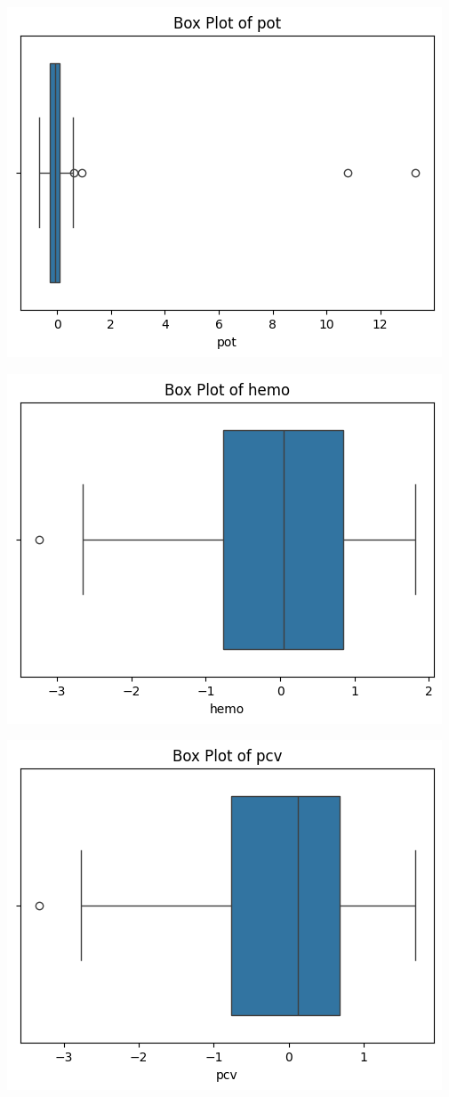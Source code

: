 \documentclass[
  11pt,
  letterpaper,
  DIV=11,
  numbers=noendperiod]{scrartcl}
\begin{document}
\includegraphics{Assignment6_Final version_files/figure-pdf/cell-18-output-8.png}

\includegraphics{Assignment6_Final version_files/figure-pdf/cell-18-output-9.png}

\includegraphics{Assignment6_Final version_files/figure-pdf/cell-18-output-10.png}
\end{document}
